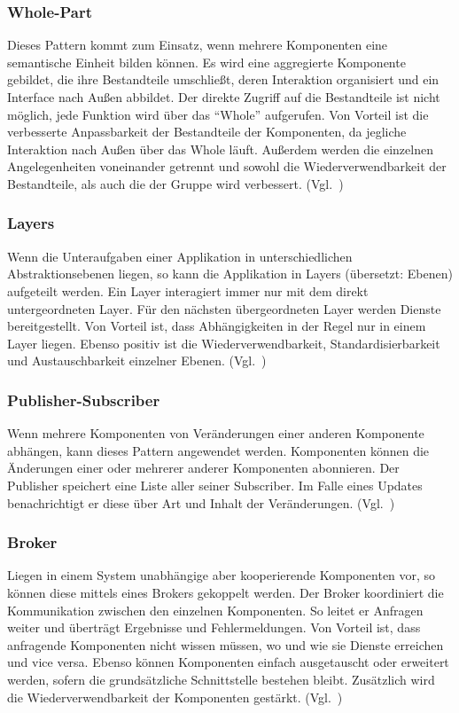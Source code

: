 \subsubsection{Whole-Part}
Dieses Pattern kommt zum Einsatz, wenn mehrere Komponenten eine semantische Einheit bilden können.
Es wird eine aggregierte Komponente gebildet, die ihre Bestandteile umschließt, deren Interaktion organisiert und ein Interface nach Außen abbildet.
Der direkte Zugriff auf die Bestandteile ist nicht möglich, jede Funktion wird über das \enquote{Whole} aufgerufen.
Von Vorteil ist die verbesserte Anpassbarkeit der Bestandteile der Komponenten, da jegliche Interaktion nach Außen über das Whole läuft.
Außerdem werden die einzelnen Angelegenheiten voneinander getrennt und sowohl die Wiederverwendbarkeit der Bestandteile, als auch die der Gruppe wird verbessert.
(Vgl.~\cite{buschmann-pattern-oriented-software-architecture})

\subsubsection{Layers}
Wenn die Unteraufgaben einer Applikation in unterschiedlichen Abstraktionsebenen liegen, so kann die Applikation in Layers (übersetzt: Ebenen) aufgeteilt werden.
Ein Layer interagiert immer nur mit dem direkt untergeordneten Layer.
Für den nächsten übergeordneten Layer werden Dienste bereitgestellt.
Von Vorteil ist, dass Abhängigkeiten in der Regel nur in einem Layer liegen.
Ebenso positiv ist die Wiederverwendbarkeit, Standardisierbarkeit und Austauschbarkeit einzelner Ebenen.
(Vgl.~\cite{buschmann-pattern-oriented-software-architecture})

\subsubsection{Publisher-Subscriber}
Wenn mehrere Komponenten von Veränderungen einer anderen Komponente abhängen, kann dieses Pattern angewendet werden.
Komponenten können die Änderungen einer oder mehrerer anderer Komponenten abonnieren.
Der Publisher speichert eine Liste aller seiner Subscriber.
Im Falle eines Updates benachrichtigt er diese über Art und Inhalt der Veränderungen.
(Vgl.~\cite{buschmann-pattern-oriented-software-architecture})

\subsubsection{Broker}
Liegen in einem System unabhängige aber kooperierende Komponenten vor, so können diese mittels eines Brokers gekoppelt werden.
Der Broker koordiniert die Kommunikation zwischen den einzelnen Komponenten.
So leitet er Anfragen weiter und überträgt Ergebnisse und Fehlermeldungen.
Von Vorteil ist, dass anfragende Komponenten nicht wissen müssen, wo und wie sie Dienste erreichen und vice versa.
Ebenso können Komponenten einfach ausgetauscht oder erweitert werden, sofern die grundsätzliche Schnittstelle bestehen bleibt.
Zusätzlich wird die Wiederverwendbarkeit der Komponenten gestärkt.
(Vgl.~\cite{buschmann-pattern-oriented-software-architecture})


